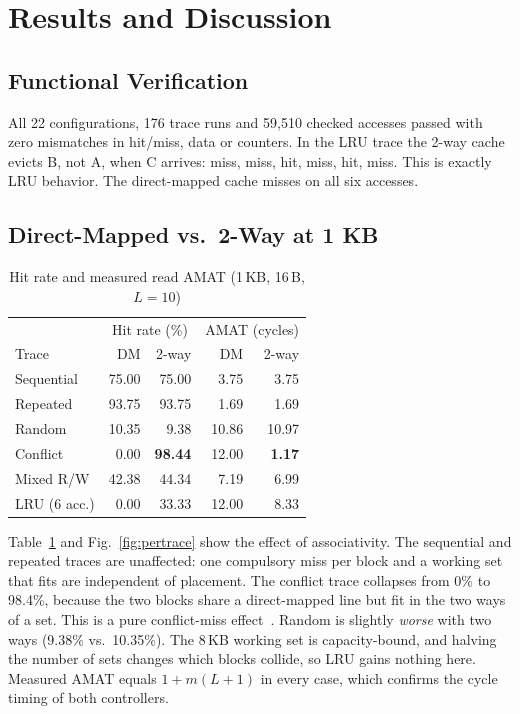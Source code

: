 \documentclass[conference]{IEEEtran}
\begin{document}
\section{Results and Discussion}\label{sec:results}
\subsection{Functional Verification}
All 22 configurations, 176 trace runs and 59{,}510 checked accesses passed with zero mismatches in hit/miss, data or counters. In the LRU trace the 2-way cache evicts B, not A, when C arrives: miss, miss, hit, miss, hit, miss. This is exactly LRU behavior. The direct-mapped cache misses on all six accesses.

\subsection{Direct-Mapped vs.\ 2-Way at 1 KB}
\begin{table}[t]\centering
\caption{Hit rate and measured read AMAT (1\,KB, 16\,B, $L=10$)}\label{tab:cmp}
\begin{tabular}{@{}lrrrr@{}}\toprule
 & \multicolumn{2}{c}{Hit rate (\%)} & \multicolumn{2}{c}{AMAT (cycles)} \\
Trace & DM & 2-way & DM & 2-way \\ \midrule
Sequential & 75.00 & 75.00 & 3.75 & 3.75 \\
Repeated   & 93.75 & 93.75 & 1.69 & 1.69 \\
Random     & 10.35 & 9.38  & 10.86 & 10.97 \\
Conflict   & 0.00  & \textbf{98.44} & 12.00 & \textbf{1.17} \\
Mixed R/W  & 42.38 & 44.34 & 7.19 & 6.99 \\
LRU (6 acc.) & 0.00 & 33.33 & 12.00 & 8.33 \\ \bottomrule
\end{tabular}\end{table}

Table~\ref{tab:cmp} and Fig.~\ref{fig:pertrace} show the effect of associativity. The sequential and repeated traces are unaffected: one compulsory miss per block and a working set that fits are independent of placement. The conflict trace collapses from 0\% to 98.4\%, because the two blocks share a direct-mapped line but fit in the two ways of a set. This is a pure conflict-miss effect~\cite{hill1989}. Random is slightly \emph{worse} with two ways (9.38\% vs.\ 10.35\%). The 8\,KB working set is capacity-bound, and halving the number of sets changes which blocks collide, so LRU gains nothing here. Measured AMAT equals $1+m(L+1)$ in every case, which confirms the cycle timing of both controllers.
\end{document}
